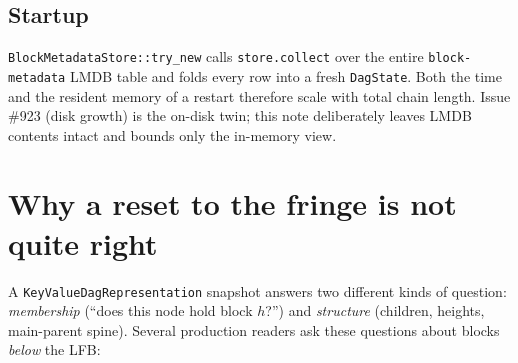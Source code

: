 \documentclass[11pt]{article}
\newcommand{\code}[1]{\texttt{#1}}
\begin{document}
\subsection{Startup}

\code{BlockMetadataStore::try\_new} calls \code{store.collect} over the entire
\code{block-metadata} LMDB table and folds every row into a fresh
\code{DagState}. Both the time and the resident memory of a restart therefore
scale with total chain length. Issue \#923 (disk growth) is the on-disk twin;
this note deliberately leaves LMDB contents intact and bounds only the
in-memory view.

\section{Why a reset to the fringe is not quite right}

A \code{KeyValueDagRepresentation} snapshot answers two different kinds of
question: \emph{membership} (``does this node hold block $h$?'') and
\emph{structure} (children, heights, main-parent spine). Several production
readers ask these questions about blocks \emph{below} the LFB:
\end{document}
